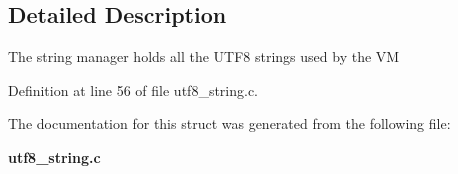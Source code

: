 \subsection{Detailed Description}
The string manager holds all the UTF8 strings used by the VM 

Definition at line 56 of file utf8\_\-string.c.



The documentation for this struct was generated from the following file:\begin{DoxyCompactItemize}
\item 
{\bf utf8\_\-string.c}\end{DoxyCompactItemize}
